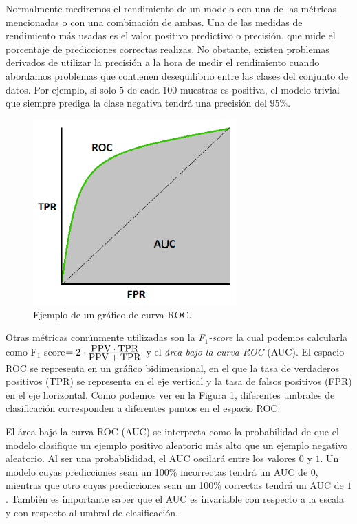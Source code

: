 \documentclass[oneside,openright,titlepage,numbers=noenddot,openany,headinclude,footinclude=true,
cleardoublepage=empty,abstractoff,BCOR=5mm,paper=a4,fontsize=12pt,main=spanish]{scrreprt}
\begin{document}
\clearpage

Normalmente mediremos el rendimiento de un modelo con una de las métricas mencionadas o con una combinación de ambas. Una de las medidas de rendimiento más usadas es el valor positivo predictivo o precisión, que mide el porcentaje de predicciones correctas realizas. No obstante, existen problemas derivados de utilizar la precisión a la hora de medir el rendimiento cuando abordamos problemas que contienen desequilibrio entre las clases del conjunto de datos. Por ejemplo, si solo $5$ de cada $100$ muestras es positiva, el modelo trivial que siempre prediga la clase negativa tendrá una precisión del $95\%$.\\

\begin{figure}[h]
	\centering
	\includegraphics[width=7.8cm]{ROC_curve.png}
	\caption{Ejemplo de un gráfico de curva ROC.}
    \label{fig:curvaROC}
\end{figure}

Otras métricas comúnmente utilizadas son la \textit{F$_1$-score} la cual podemos calcularla como F$_1$-score$=2 \cdot \frac{\displaystyle \text{PPV}\cdot \text{TPR}}{\displaystyle \text{PPV}+\text{TPR}}$ y el \textit{área bajo la curva ROC} (AUC). El espacio ROC se representa en
un gráfico bidimensional, en el que la tasa de verdaderos positivos (TPR) se representa en el eje vertical y la tasa de falsos positivos (FPR) en
el eje horizontal. Como podemos ver en la Figura \ref{fig:curvaROC}, diferentes umbrales de clasificación corresponden a diferentes puntos en el espacio ROC.  

El área bajo la curva ROC (AUC) se interpreta como la probabilidad de que el modelo clasifique un ejemplo positivo aleatorio más alto que un ejemplo negativo aleatorio. Al ser una probablididad, el AUC oscilará entre los valores $0$ y $1$. Un modelo cuyas predicciones sean un 100\% incorrectas tendrá un AUC de $0$, mientras que otro cuyas predicciones sean un 100\% correctas tendrá un AUC de $1$. También es importante saber que el AUC es invariable con respecto a la escala y con respecto al umbral de clasificación.
\end{document}
